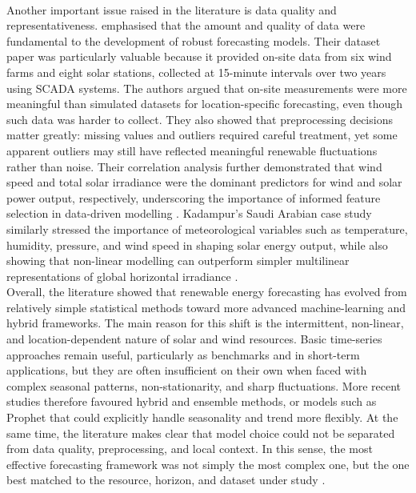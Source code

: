 \documentclass[conference]{IEEEtran}
\begin{document}
\\Another important issue raised in the literature is data quality and representativeness. \cite{chen_xu_china_data} emphasised that the amount and quality of data were fundamental to the development of robust forecasting models. Their dataset paper was particularly valuable because it provided on-site data from six wind farms and eight solar stations, collected at 15-minute intervals over two years using SCADA systems. The authors argued that on-site measurements were more meaningful than simulated datasets for location-specific forecasting, even though such data was harder to collect. They also showed that preprocessing decisions matter greatly: missing values and outliers required careful treatment, yet some apparent outliers may still have reflected meaningful renewable fluctuations rather than noise. Their correlation analysis further demonstrated that wind speed and total solar irradiance were the dominant predictors for wind and solar power output, respectively, underscoring the importance of informed feature selection in data-driven modelling \cite{chen_xu_china_data}. Kadampur’s Saudi Arabian case study similarly stressed the importance of meteorological variables such as temperature, humidity, pressure, and wind speed in shaping solar energy output, while also showing that non-linear modelling can outperform simpler multilinear representations of global horizontal irradiance \cite{kadampur_solar_case}. 
\\Overall, the literature showed that renewable energy forecasting has evolved from relatively simple statistical methods toward more advanced machine-learning and hybrid frameworks. The main reason for this shift is the intermittent, non-linear, and location-dependent nature of solar and wind resources. Basic time-series approaches remain useful, particularly as benchmarks and in short-term applications, but they are often insufficient on their own when faced with complex seasonal patterns, non-stationarity, and sharp fluctuations. More recent studies therefore favoured hybrid and ensemble methods, or models such as Prophet that could explicitly handle seasonality and trend more flexibly. At the same time, the literature makes clear that model choice could not be separated from data quality, preprocessing, and local context. In this sense, the most effective forecasting framework was not simply the most complex one, but the one best matched to the resource, horizon, and dataset under study \cite{prema_review_forecast,islam_forecasting_resources,chen_xu_china_data,alencar_wind_forecasting}.
\end{document}
